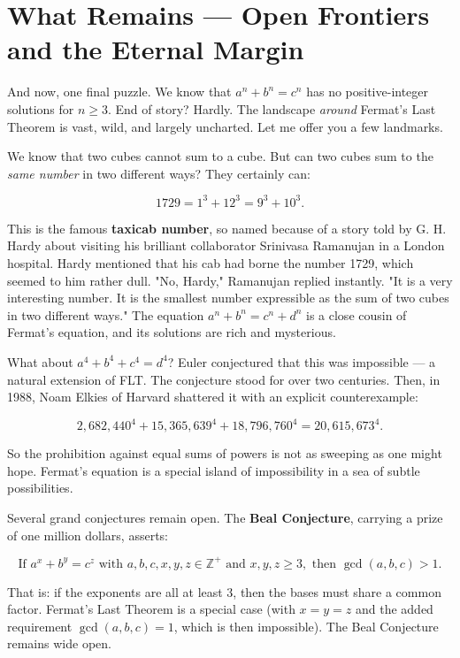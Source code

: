 \bigskip

\section*{What Remains --- Open Frontiers and the Eternal Margin}

And now, one final puzzle. We know that $a^n + b^n = c^n$ has no positive-integer solutions for $n \ge 3$. End of story? Hardly. The landscape \textit{around} Fermat's Last Theorem is vast, wild, and largely uncharted. Let me offer you a few landmarks.

We know that two cubes cannot sum to a cube. But can two cubes sum to the \textit{same number} in two different ways? They certainly can:

\[
1729 = 1^3 + 12^3 = 9^3 + 10^3.
\]

This is the famous \textbf{taxicab number}, so named because of a story told by G. H. Hardy about visiting his brilliant collaborator Srinivasa Ramanujan in a London hospital. Hardy mentioned that his cab had borne the number 1729, which seemed to him rather dull. "No, Hardy," Ramanujan replied instantly. "It is a very interesting number. It is the smallest number expressible as the sum of two cubes in two different ways." The equation $a^n + b^n = c^n + d^n$ is a close cousin of Fermat's equation, and its solutions are rich and mysterious.

What about $a^4 + b^4 + c^4 = d^4$? Euler conjectured that this was impossible --- a natural extension of FLT. The conjecture stood for over two centuries. Then, in 1988, Noam Elkies of Harvard shattered it with an explicit counterexample:

\[
2{,}682{,}440^4 + 15{,}365{,}639^4 + 18{,}796{,}760^4 = 20{,}615{,}673^4.
\]

So the prohibition against equal sums of powers is not as sweeping as one might hope. Fermat's equation is a special island of impossibility in a sea of subtle possibilities.

Several grand conjectures remain open. The \textbf{Beal Conjecture}, carrying a prize of one million dollars, asserts:

\[
\text{If } a^x + b^y = c^z \text{ with } a, b, c, x, y, z \in \mathbb{Z}^+ \text{ and } x, y, z \ge 3, \text{ then } \gcd(a, b, c) > 1.
\]

That is: if the exponents are all at least $3$, then the bases must share a common factor. Fermat's Last Theorem is a special case (with $x = y = z$ and the added requirement $\gcd(a,b,c) = 1$, which is then impossible). The Beal Conjecture remains wide open.

